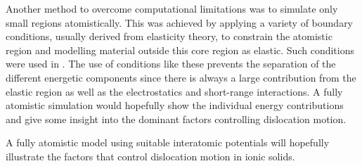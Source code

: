 Another method to overcome computational limitations was to simulate only small regions atomistically. This was achieved by applying a variety of boundary conditions, usually derived from elasticity theory, to constrain the atomistic region and modelling material outside this core region as elastic. Such conditions were used in \cite{Woo1977}. The use of conditions like these prevents the separation of the different energetic components since there is always a large contribution from the elastic region as well as the electrostatics and short-range interactions. A fully atomistic simulation would hopefully show the individual energy contributions and give some insight into the dominant factors  controlling dislocation motion.

A fully atomistic model using suitable interatomic potentials will hopefully illustrate the factors that control dislocation motion in ionic solids.

































